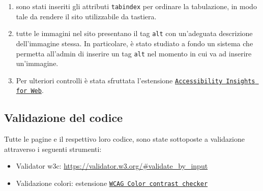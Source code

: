 \begin{enumerate}
\begin{itemize}
	\end{itemize}	
	\item sono stati inseriti gli attributi \texttt{tabindex} per ordinare la tabulazione, in modo tale da rendere il sito utilizzabile da tastiera.
	\item tutte le immagini nel sito presentano il tag \texttt{alt} con un'adeguata descrizione dell'immagine stessa. In particolare, è stato studiato a fondo un sistema che permetta all'admin di inserire un tag \texttt{alt} nel momento in cui va ad inserire un'immagine. 
	\item Per ulteriori controlli è stata sfruttata l'estensione \href{https://chrome.google.com/webstore/detail/accessibility-insights-fo/pbjjkligggfmakdaogkfomddhfmpjeni}{\texttt{Accessibility Insights for Web}}.
\end{enumerate}
\subsection{Validazione del codice}
Tutte le pagine e il respettivo loro codice, sono state sottoposte a validazione attraverso i seguenti strumenti:\begin{itemize}
\item Validator w3c: \url{https://validator.w3.org/#validate_by_input}
\item Validazione colori: estensione \href{https://chrome.google.com/webstore/detail/wcag-color-contrast-
check/plnahcmalebffmaghcpcmpaciebdhgdf}{\texttt{WCAG Color contrast checker}}
\end{itemize}